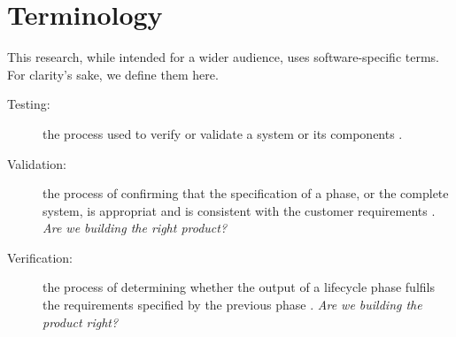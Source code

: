\chapter{Terminology}
This research, while intended for a wider audience, uses software-specific
terms. For clarity's sake, we define them here.

\begin{description}

\item[Testing:] the process used to verify or validate a system or its 
components \cite{Storey95}.

\item[Validation:] the process of confirming that the specification of a phase,
or the complete system, is appropriat and is consistent with the customer
requirements \cite{Storey95}. \textit{Are we building the right product?}

\item[Verification:] the process of determining whether the output of a
lifecycle phase fulfils the requirements specified by the previous phase
\cite{Storey95}. \textit{Are we building the product right?}


\end{description}